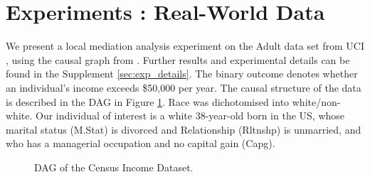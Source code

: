 \documentclass{article}
\theoremstyle{plain}
\theoremstyle{definition}
\theoremstyle{remark}
\theoremstyle{mystyle}
\begin{document}
\section{Experiments : Real-World Data}
\label{sec:exp_uci}
We present a local mediation analysis experiment on the Adult data set from UCI , using the causal graph from . Further results and experimental details can be found in the Supplement \ref{sec:exp_details}.
The binary outcome denotes whether an individual's income exceeds \$50,000 per year. 
The causal structure of the data is described in the DAG in Figure \ref{fig:dag_uci}. Race was dichotomised into white/non-white. Our individual of interest is a white 38-year-old born in the US, whose marital status (M.Stat) is divorced and Relationship (Rltnshp) is unmarried, and who has a managerial occupation and no capital gain (Capg).
\begin{figure}
\centering
{}
\caption{DAG of the Census Income Dataset.}
\label{fig:dag_uci}
\end{figure}
\end{document}
